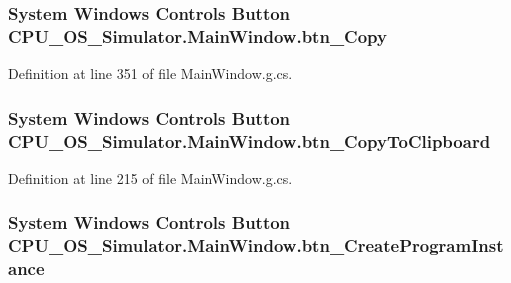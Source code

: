\subsubsection[{btn\+\_\+\+Copy}]{\setlength{\rightskip}{0pt plus 5cm}System Windows Controls Button C\+P\+U\+\_\+\+O\+S\+\_\+\+Simulator.\+Main\+Window.\+btn\+\_\+\+Copy\hspace{0.3cm}{\ttfamily [package]}}\label{class_c_p_u___o_s___simulator_1_1_main_window_a55b2516a7b78d0e79deac7f1a79f3a92}


Definition at line 351 of file Main\+Window.\+g.\+cs.

\hypertarget{class_c_p_u___o_s___simulator_1_1_main_window_ad56a38e017d6d47d2076b1ec33e3521d}{}
\subsubsection[{btn\+\_\+\+Copy\+To\+Clipboard}]{\setlength{\rightskip}{0pt plus 5cm}System Windows Controls Button C\+P\+U\+\_\+\+O\+S\+\_\+\+Simulator.\+Main\+Window.\+btn\+\_\+\+Copy\+To\+Clipboard\hspace{0.3cm}{\ttfamily [package]}}\label{class_c_p_u___o_s___simulator_1_1_main_window_ad56a38e017d6d47d2076b1ec33e3521d}


Definition at line 215 of file Main\+Window.\+g.\+cs.

\hypertarget{class_c_p_u___o_s___simulator_1_1_main_window_afd63a7da59cbd27226ff97e57cca47f6}{}
\subsubsection[{btn\+\_\+\+Create\+Program\+Instance}]{\setlength{\rightskip}{0pt plus 5cm}System Windows Controls Button C\+P\+U\+\_\+\+O\+S\+\_\+\+Simulator.\+Main\+Window.\+btn\+\_\+\+Create\+Program\+Instance\hspace{0.3cm}{\ttfamily [package]}}\label{class_c_p_u___o_s___simulator_1_1_main_window_afd63a7da59cbd27226ff97e57cca47f6}


